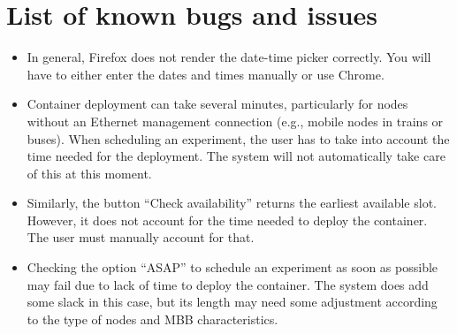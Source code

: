 \documentclass[a4paper,10pt]{article}
\begin{document}

\section{List of known bugs and issues}

\begin{itemize}
	
	\item In general, Firefox does not render the date-time picker correctly. You will have to either enter the dates and times manually or use Chrome.
	\item Container deployment can take several minutes, particularly for nodes without an Ethernet management connection (e.g., mobile nodes in trains or buses). When scheduling an experiment, the user has to take into account the time needed for the deployment. The system will not automatically take care of this at this moment.
	\item Similarly, the button ``Check availability'' returns the earliest available slot. However, it does not account for the time needed to deploy the container. The user must manually account for that.
	\item Checking the option ``ASAP'' to schedule an experiment as soon as possible may fail due to lack of time to deploy the container. The system does add some slack in this case, but its length may need some adjustment according to the type of nodes and MBB characteristics.
\end{itemize}

\end{document}
